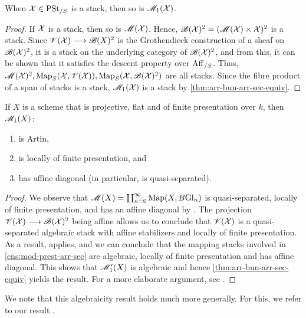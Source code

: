 \documentclass[11pt]{amsart}
\begin{document}
\begin{thm}
When $\mathcal{X} \in \mathrm{PSt}_{/S}$ is a stack, then so is $\mathscr{M}_1(\mathcal{X})$.
\end{thm}
\begin{proof}
If $\mathcal{X}$ is a stack, then so is $\mathscr{M}(\mathcal{X})$. Hence,
$\mathscr{B}(\mathcal{X})^2 = (\mathscr{M}(\mathcal{X}) \times \mathcal{X})^2$ is a stack.
Since $\sV(\mcX) \to \sB(X)^2$ is the Grothendieck construction
of a sheaf on $\mathscr{B}(\mathcal{X})^2$, it is a stack on the underlying category of
$\mathscr{B}(\mathcal{X})^2$, and from this, it can be shown that it satisfies the descent
property over $\mathrm{Aff}_{/S}$.
Thus, $\mathscr{M}(\mathcal{X})^2, \mathrm{Map}_S(\mathcal{X}, \mathscr{V}(\mathcal{X})), \mathrm{Map}_S(\mathcal{X}, \mathscr{B}(\mathcal{X})^2)$
are all stacks. Since the fibre product of a span of stacks is a stack,
$\mathscr{M}_1(\mathcal{X})$ is a stack by \cref{thm:arr-bun-arr-sec-equiv}.
\end{proof}

\begin{thm}\label{thm:mod-st-arr-bun-alg}
If $X$ is a scheme that is projective, flat and of finite presentation over $k$,
then $\mathscr{M}_1(X)$:
\begin{enumerate}
\item is Artin,
\item is locally of finite presentation, and
\item has affine diagonal (in particular, is quasi-separated).
\end{enumerate}
\end{thm}
\begin{proof}
We observe that $\mathscr{M}(X) = \coprod_{n = 0}^\infty \mathrm{Map}(X, B\mathrm{Gl}_n)$
is quasi-separated, locally of finite presentation, and has an affine diagonal by
\cite[Theorem 1.0.1.]{Wang-BunG}. The projection
$\sV(\mcX) \to \sB(\mcX)^2$ being affine allows us to conclude
that $\mathscr{V}(\mathcal{X})$ is a quasi-separated algebraic stack with affine stabilizers and
locally of finite presentation.
As a result, \cite[Theorem 1.2]{HR19} applies, and we can conclude that the
mapping stacks involved in \cref{cns:mod-prest-arr-sec} are algebraic, locally
of finite presentation and has affine diagonal. This shows that
$\mathscr{M}_1'(X)$ is algebraic and hence \cref{thm:arr-bun-arr-sec-equiv} yields
the result. For a more elaborate argument, see \cite[\S 4]{ModQuivBun}.
\end{proof}

\begin{rmk}
We note that this algebraicity result holds much more generally. For this, we
refer to our result \cite[Theorem 4.10]{ModQuivBun}.
\end{rmk}
\end{document}
